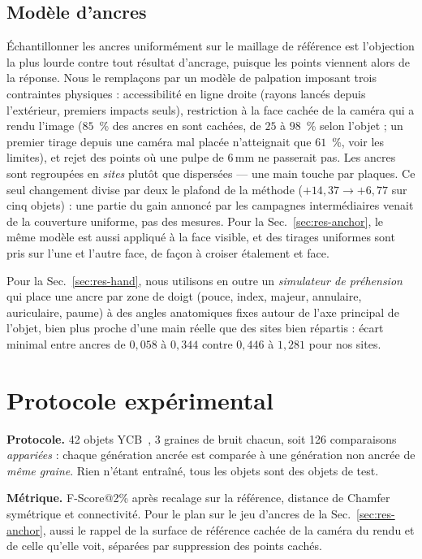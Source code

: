 \documentclass[conference]{IEEEtran}
\begin{document}
\subsection{Modèle d'ancres}
\label{sec:contactmodel}

Échantillonner les ancres uniformément sur le maillage de référence est l'objection la
plus lourde contre tout résultat d'ancrage, puisque les points viennent alors de la
réponse. Nous le remplaçons par un modèle de palpation imposant trois contraintes
physiques : accessibilité en ligne droite (rayons lancés depuis l'extérieur, premiers
impacts seuls), restriction à la face cachée de la caméra qui a rendu l'image
($85$~\% des ancres en sont cachées, de $25$ à $98$~\% selon l'objet ; un premier
tirage depuis une caméra mal placée n'atteignait que $61$~\%, voir les limites), et
rejet des points où
une pulpe de 6\,mm ne passerait pas. Les ancres sont regroupées en \emph{sites} plutôt
que dispersées --- une main touche par plaques. Ce seul changement divise par deux le
plafond de la méthode ($+14{,}37 \rightarrow +6{,}77$ sur cinq objets) : une partie du
gain annoncé par les campagnes intermédiaires venait de la couverture uniforme, pas des
mesures. Pour la Sec.~\ref{sec:res-anchor}, le même modèle est aussi appliqué à la face
visible, et des tirages uniformes sont pris sur l'une et l'autre face, de façon à
croiser étalement et face.

Pour la Sec.~\ref{sec:res-hand}, nous utilisons en outre un \emph{simulateur de
préhension} qui place une ancre par zone de doigt (pouce, index, majeur, annulaire,
auriculaire, paume) à des angles anatomiques fixes autour de l'axe principal de
l'objet, bien plus proche d'une main réelle que des sites bien répartis : écart minimal
entre ancres de $0{,}058$ à $0{,}344$ contre $0{,}446$ à $1{,}281$ pour nos sites.

\section{Protocole expérimental}

\textbf{Protocole.} 42 objets YCB~\cite{ycb}, 3 graines de bruit chacun, soit 126
comparaisons \emph{appariées} : chaque génération ancrée est comparée à une génération
non ancrée de \emph{même graine}. Rien n'étant entraîné, tous les objets sont des
objets de test.

\textbf{Métrique.} F-Score@2\% après recalage sur la référence, distance de Chamfer
symétrique et connectivité. Pour le plan sur le jeu d'ancres de la
Sec.~\ref{sec:res-anchor}, aussi le rappel de la surface de référence cachée de la
caméra du rendu et de celle qu'elle voit, séparées par suppression des points cachés.
\end{document}
